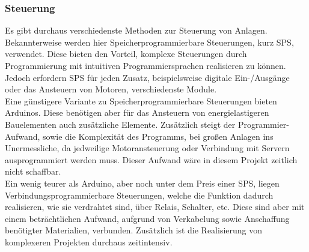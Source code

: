 \subsubsection{Steuerung}
Es gibt durchaus verschiedenste Methoden zur Steuerung von Anlagen. Bekannterweise werden hier Speicherprogrammierbare Steuerungen, kurz SPS, verwendet. Diese bieten den Vorteil, komplexe Steuerungen durch Programmierung mit intuitiven Programmiersprachen realisieren zu können. Jedoch erfordern SPS für jeden Zusatz, beispielsweise digitale Ein-/Ausgänge oder das Ansteuern von Motoren, verschiedenste Module. \\
Eine günstigere Variante zu Speicherprogrammierbare Steuerungen bieten Arduinos. Diese benötigen aber für das Ansteuern von energielastigeren Bauelementen auch zusätzliche Elemente. Zusätzlich steigt der Programmier-Aufwand, sowie die Komplexität des Programms, bei großen Anlagen ins Unermessliche, da jedweilige Motoransteuerung oder Verbindung mit Servern ausprogrammiert werden muss. Dieser Aufwand wäre in diesem Projekt zeitlich nicht schaffbar.\\
Ein wenig teurer als Arduino, aber noch unter dem Preis einer SPS, liegen Verbindungsprogrammierbare Steuerungen, welche die Funktion dadurch realisieren, wie sie verdrahtet sind, über Relais, Schalter, etc. Diese sind aber mit einem beträchtlichen Aufwand, aufgrund von Verkabelung sowie Anschaffung benötigter Materialien, verbunden. Zusätzlich ist die Realisierung von komplexeren Projekten durchaus zeitintensiv. 


